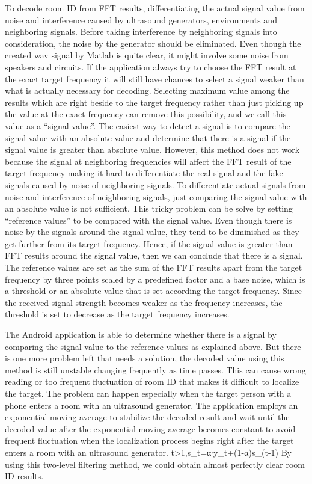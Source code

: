 To decode room ID from FFT results, differentiating the actual signal value from noise and interference caused by ultrasound generators, environments and neighboring signals. Before taking interference by neighboring signals into consideration, the noise by the generator should be eliminated. Even though the created wav signal by Matlab is quite clear, it might involve some noise from speakers and circuits. If the application always try to choose the FFT result at the exact target frequency it will still have chances to select a signal weaker than what is actually necessary for decoding. Selecting maximum value among the results which are right beside to the target frequency rather than just picking up the value at the exact frequency can remove this possibility, and we call this value as a “signal value”. The easiest way to detect a signal is to compare the signal value with an absolute value and determine that there is a signal if the signal value is greater than absolute value. However, this method does not work because the signal at neighboring frequencies will affect the FFT result of the target frequency making it hard to differentiate the real signal and the fake signals caused by noise of neighboring signals. To differentiate actual signals from noise and interference of neighboring signals, just comparing the signal value with an absolute value is not sufficient. This tricky problem can be solve by setting “reference values” to be compared with the signal value. Even though there is noise by the signals around the signal value, they tend to be diminished as they get further from its target frequency. Hence, if the signal value is greater than FFT results around the signal value, then we can conclude that there is a signal. The reference values are set as the sum of the FFT results apart from the target frequency by three points scaled by a predefined factor and a base noise, which is a threshold or an absolute value that is set according the target frequency. Since the received signal strength becomes weaker as the frequency increases, the threshold is set to decrease as the target frequency increases.

The Android application is able to determine whether there is a signal by comparing the signal value to the reference values as explained above. But there is one more problem left that needs a solution, the decoded value using this method is still unstable changing frequently as time passes. This can cause wrong reading or too frequent fluctuation of room ID that makes it difficult to localize the target.  The problem can happen especially when the target person with a phone enters a room with an ultrasound generator. The application employs an exponential moving average to stabilize the decoded result and wait until the decoded value after the exponential moving average becomes constant to avoid frequent fluctuation when the localization process begins right after the target enters a room with an ultrasound generator.
t>1,s_t=α∙y_t+(1-α)s_(t-1)
By using this two-level filtering method, we could obtain almost perfectly clear room ID results.

